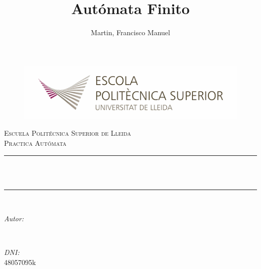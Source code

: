 \documentclass{article}
\title{Autómata Finito}
\author{Martin, Francisco Manuel
}
\makeatletter
\let\thetitle\@title
\let\theauthor\@author
\let\thedate\@date
\makeatother
\begin{document}
    \begin{titlepage}
        \begin{figure}[h]

            \includegraphics[scale=0.38]{1}
        \end{figure}
        \centering
        \vspace*{0.5 cm}

        \textsc{\LARGE Escuela Politécnica Superior de Lleida}\\[2.0 cm]    %
        \textsc{\large Practica Autómata}\\[0.5 cm]                %
        \rule{\linewidth}{0.2 mm} \\[0.4 cm]
        { \huge \bfseries \thetitle}\\
        \rule{\linewidth}{0.2 mm} \\[1.5 cm]

        \begin{minipage}{0.4\textwidth}
            \begin{flushleft}
                \large
                \emph{Autor:}\\
                \theauthor
            \end{flushleft}
        \end{minipage}~
        \begin{minipage}{0.4\textwidth}
            \begin{flushright}
                \large
                \emph{DNI:} \\
                48057095k %
            \end{flushright}
        \end{minipage}\\[2 cm]

        {\large \thedate}\\[2 cm]

        \vfill
    \end{titlepage}
    \tableofcontents
    \pagebreak
\end{document}
